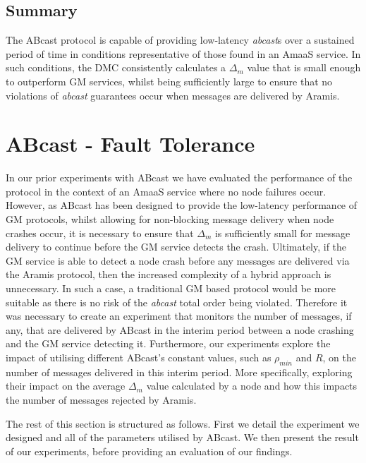     \subsection{Summary}
    The \textsf{ABcast} protocol is capable of providing low-latency \emph{abcast}s over a sustained period of time in conditions representative of those found in an \textsf{AmaaS} service.  In such conditions, the DMC consistently calculates a $\Delta_m$ value that is small enough to outperform GM services, whilst being sufficiently large to ensure that no violations of \emph{abcast} guarantees occur when messages are delivered by \textsf{Aramis}.  
    
\section{ABcast - Fault Tolerance}\label{sec:infini_crashed_node}
    In our prior experiments with \textsf{ABcast} we have evaluated the performance of the protocol in the context of an \textsf{AmaaS} service where no node failures occur.  However, as \textsf{ABcast} has been designed to provide the low-latency performance of GM protocols, whilst allowing for non-blocking message delivery when node crashes occur, it is necessary to ensure that $\Delta_m$ is sufficiently small for message delivery to continue before the GM service detects the crash.  Ultimately, if the GM service is able to detect a node crash before any messages are delivered via the \textsf{Aramis} protocol, then the increased complexity of a hybrid approach is unnecessary.  In such a case, a traditional GM based protocol would be more suitable as there is no risk of the \emph{abcast} total order being violated.  Therefore it was necessary to create an experiment that monitors the number of messages, if any, that are delivered by \textsf{ABcast} in the interim period between a node crashing and the GM service detecting it.  Furthermore, our experiments explore the impact of utilising different \textsf{ABcast}'s constant values, such as $\rho_{min}$ and $R$, on the number of messages delivered in this interim period.  More specifically, exploring their impact on the average $\Delta_m$ value calculated by a node and how this impacts the number of messages rejected by \textsf{Aramis}.  
      
   The rest of this section is structured as follows.  First we detail the experiment we designed and all of the parameters utilised by \textsf{ABcast}.  We then present the result of our experiments, before providing an evaluation of our findings.  
    

